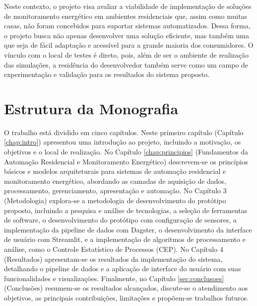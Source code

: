 Neste contexto, o projeto visa avaliar a viabilidade de implementação de soluções de monitoramento energético em ambientes residenciais que, assim como muitas casas, não foram concebidos para suportar sistemas automatizados. Dessa forma, o projeto busca não apenas desenvolver uma solução eficiente, mas também uma que seja de fácil adaptação e acessível para a grande maioria dos consumidores. O vínculo com o local de testes é direto, pois, além de ser o ambiente de realização das simulações, a residência do desenvolvedor também serve como um campo de experimentação e validação para os resultados do sistema proposto.

\section{Estrutura da Monografia}
\label{sec:organizacao}

O trabalho está dividido em cinco capítulos. Neste primeiro capítulo (Capítulo \ref{chap:intro}) apresentou uma introdução ao projeto, incluindo a motivação, os objetivos e o local de realização. No Capítulo \ref{chap:principios} (Fundamentos da Automação Residencial e Monitoramento Energético) descrevem-se os princípios básicos e modelos arquiteturais para sistemas de automação residencial e monitoramento energético, abordando as camadas de aquisição de dados, processamento, gerenciamento, apresentação e automação. No Capítulo 3 (Metodologia) explora-se a metodologia de desenvolvimento do protótipo proposto, incluindo a pesquisa e análise de tecnologias, a seleção de ferramentas de software, o desenvolvimento do protótipo com configuração de sensores, a implementação da pipeline de dados com Dagster, o desenvolvimento da interface de usuário com Streamlit, e a implementação de algoritmos de processamento e análise, como o Controle Estatístico de Processos (CEP). No Capítulo 4 (Resultados) apresentam-se os resultados da implementação do sistema, detalhando o pipeline de dados e a aplicação de interface do usuário com suas funcionalidades e visualizações. Finalmente, no Capítulo \ref{sec:conclusoes} (Conclusões) resumem-se os resultados alcançados, discute-se o atendimento aos objetivos, as principais contribuições, limitações e propõem-se trabalhos futuros.

\clearpage
